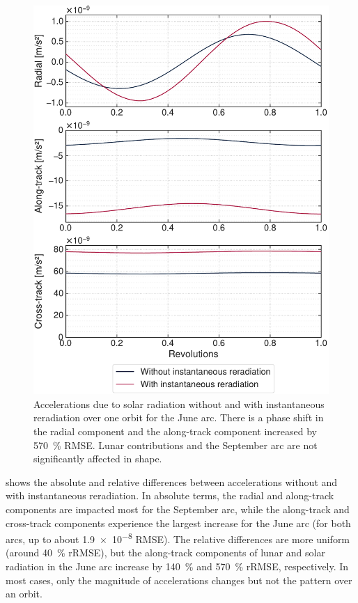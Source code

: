 \begin{figure}[t]
    \centering
    \includegraphics[width=\linewidth]{figures/plots/acc_reradiation_sun_jun.pdf}
    \caption{Accelerations due to solar radiation without and with instantaneous reradiation over one orbit for the June arc. There is a phase shift in the radial component and the along-track component increased by \qty{570}{\percent} \gls{RMSE}. Lunar contributions and the September arc are not significantly affected in shape.}
    \label{fig:acc-reradiation}
\end{figure}

 shows the absolute and relative differences between accelerations without and with instantaneous reradiation. In absolute terms, the radial and along-track components are impacted most for the September arc, while the along-track and cross-track components experience the largest increase for the June arc (for both arcs, up to about \qty{1.9e-8}{\acc} \gls{RMSE}). The relative differences are more uniform (around \qty{40}{\percent} \gls{rRMSE}), but the along-track components of lunar and solar radiation in the June arc increase by \qty{140}{\percent} and \qty{570}{\percent} \gls{rRMSE}, respectively. In most cases, only the magnitude of accelerations changes but not the pattern over an orbit.

